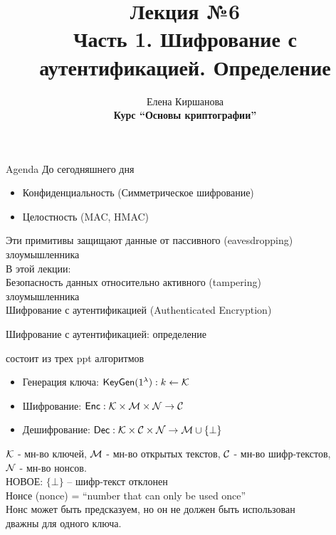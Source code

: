 \documentclass[usenames,dvipsnames,8pt,aspectratio=169]{beamer}
\title{Лекция №6 \\[10pt]
	Часть 1. Шифрование с аутентификацией. Определение }
\date{ Елена Киршанова \\  \textbf{Курс ``Основы криптографии''} \\  }
\begin{document}
	
\begin{frame}
	\titlepage
\end{frame}

\begin{frame}{Agenda}
	\Large 
	До сегодняшнего дня 
	\begin{itemize}
		\item Конфиденциальность (Симметрическое шифрование)
		\item Целостность (MAC, HMAC)
	\end{itemize}
	\vspace{20pt}
	Эти примитивы защищают данные от {\color{Orange} пассивного (eavesdropping) злоумышленника}\\
	 
	\vspace{20pt}
	В этой лекции: \\
	Безопасность данных относительно {\color{Orange} активного (tampering)  \\ злоумышленника}\\[10pt]
	\LARGE Шифрование с аутентификацией (Authenticated Encryption)

\end{frame}

\begin{frame}{Шифрование с аутентификацией: определение}
\Large

{\color{Orange}{Шифрование с аутентификацией (AE)}} состоит из трех ppt алгоритмов
\begin{itemize}
	\itemsep 10pt
	\item Генерация ключа: $\textsf{KeyGen}(1^\lambda): k \leftarrow \mathcal{K}$
	\item Шифрование: $\textsf{Enc}: \mathcal{K} \times \mathcal{M} \times \mathcal{N} \rightarrow \mathcal{C}$
	\item Дешифрование:  $\textsf{Dec}: \mathcal{K} \times \mathcal{C}  \times \mathcal{N} \rightarrow \mathcal{M} \cup \{\bot\}$
\end{itemize}
\vspace{15pt}
$\mathcal{K}$ - мн-во ключей, $\mathcal{M}$ - мн-во открытых текстов, $\mathcal{C}$ - мн-во шифр-текстов,  \\ $\mathcal{N}$ - мн-во {\color{Orange} нонсов}. \\[10pt]


НОВОЕ: $\{\bot\}$ -- шифр-текст отклонен \\[10pt]


{\color{Orange} Нонсе (nonce)} = ``number that can only be used once'' \\[5pt]
Нонс может быть предсказуем, но он не должен быть использован \\ {\color{Orange} дважны} для одного ключа. \\[5pt]

\end{frame}
\end{document}

